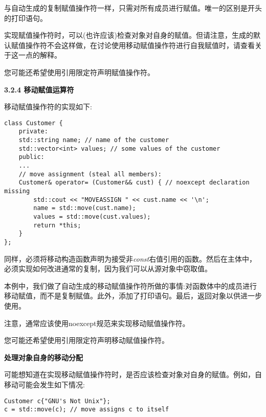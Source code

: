 与自动生成的复制赋值操作符一样，只需对所有成员进行赋值。唯一的区别是开头的打印语句。\par

实现赋值操作符时，可以(也许应该)检查对象对自身的赋值。但请注意，生成的默认赋值操作符不会这样做，在讨论使用移动赋值操作符进行自我赋值时，请查看关于这一点的解释。\par

您可能还希望使用引用限定符声明赋值操作符。\par

\hspace*{\fill} \par %
\textbf{3.2.4 移动赋值运算符}

移动赋值操作符的实现如下:\par

\begin{lstlisting}[caption={}]
class Customer {
	private:
	std::string name; // name of the customer
	std::vector<int> values; // some values of the customer
	public:
	...
	// move assignment (steal all members):
	Customer& operator= (Customer&& cust) { // noexcept declaration missing
		std::cout << "MOVEASSIGN " << cust.name << '\n';
		name = std::move(cust.name);
		values = std::move(cust.values);
		return *this;
	}
};
\end{lstlisting}

同样，必须将移动构造函数声明为接受非\textit{const}右值引用的函数。然后在主体中，必须实现如何改进通常的复制，因为我们可以从源对象中窃取值。\par

本例中，我们做了自动生成的移动赋值操作符所做的事情:对函数体中的成员进行移动赋值，而不是复制赋值。此外，添加了打印语句。最后，返回对象以供进一步使用。\par

注意，通常应该使用noexcept规范来实现移动赋值操作符。\par

您可能还希望使用引用限定符声明移动赋值操作符。\par

\hspace*{\fill} \par %
\textbf{处理对象自身的移动分配}

可能想知道在实现移动赋值操作符时，是否应该检查对象对自身的赋值。例如，自移动可能会发生如下情况:\par

\begin{lstlisting}[caption={}]
Customer c{"GNU's Not Unix"};
c = std::move(c); // move assigns c to itself
\end{lstlisting}

